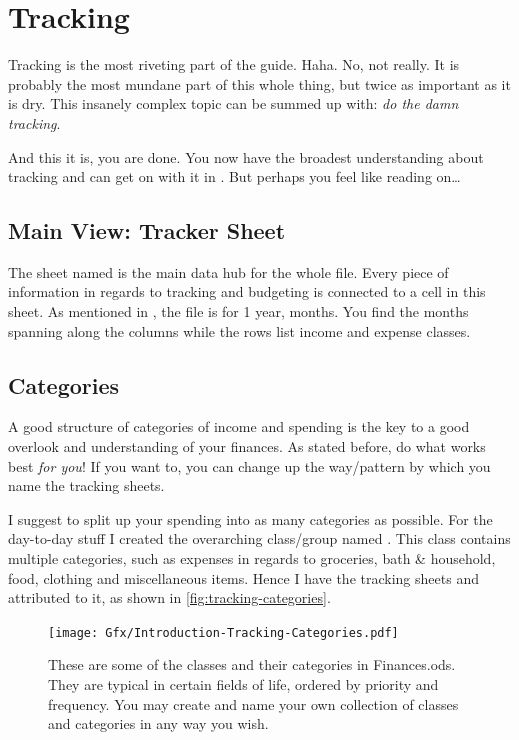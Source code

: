 \section{Tracking}
\label{sec:tracking}

Tracking is the most riveting part of the guide.
Haha.
No, not really.
It is probably the most mundane part of this whole thing, but twice as important as it is dry.
This insanely complex topic can be summed up with: \emph{do the damn tracking}.

And this it is, you are done.
You now have the broadest understanding about tracking and can get on with it in \tfn.
But perhaps you feel like reading on\ldots

\subsection{Main View: Tracker Sheet}
\label{subsec:main-tracker-sheet}

The sheet named  is the main data hub for the whole file.
Every piece of information in regards to tracking and budgeting is connected to a cell in this sheet.
As mentioned in , the file is for 1 year,  months.
You find the months spanning along the columns while the rows list income and expense classes.

\subsection{Categories}
\label{subsec:tracking-categories}

A good structure of categories of income and spending is the key to a good overlook and understanding of your finances.
As stated before, do what works best \emph{for you}!
If you want to, you can change up the way/pattern by which you name the tracking sheets.

I suggest to split up your spending into as many categories as possible.
For the day-to-day stuff I created the overarching class/group named .
This class contains multiple categories, such as expenses in regards to groceries, bath \& household, food, clothing and miscellaneous items.
Hence I have the tracking sheets  and  attributed to it, as shown in \autoref{fig:tracking-categories}.

\begin{figure}[htp]
	\centering
	\texttt{[image: Gfx/Introduction-Tracking-Categories.pdf]}
	\caption[Tracking Categories]{These are some of the classes and their categories in Finances.ods.
	They are typical in certain fields of life, ordered by priority and frequency.
	You may create and name your own collection of classes and categories in any way you wish.%
	}
	\label{fig:tracking-categories}
\end{figure}

